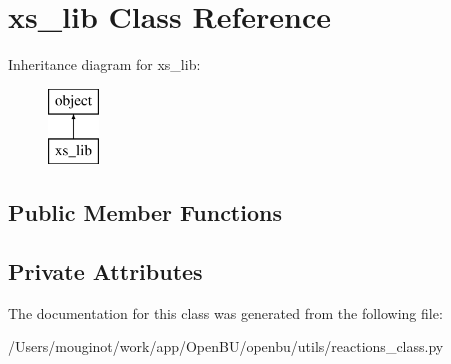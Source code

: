 \hypertarget{classopenbu_1_1utils_1_1reactions__class_1_1xs__lib}{}\section{xs\+\_\+lib Class Reference}
\label{classopenbu_1_1utils_1_1reactions__class_1_1xs__lib}
Inheritance diagram for xs\+\_\+lib\+:\begin{figure}[H]
\begin{center}
\leavevmode
\includegraphics[height=2.000000cm]{classopenbu_1_1utils_1_1reactions__class_1_1xs__lib}
\end{center}
\end{figure}
\subsection*{Public Member Functions}
\subsection*{Private Attributes}


The documentation for this class was generated from the following file\+:\begin{DoxyCompactItemize}
\item 
/\+Users/mouginot/work/app/\+Open\+B\+U/openbu/utils/reactions\+\_\+class.\+py\end{DoxyCompactItemize}
